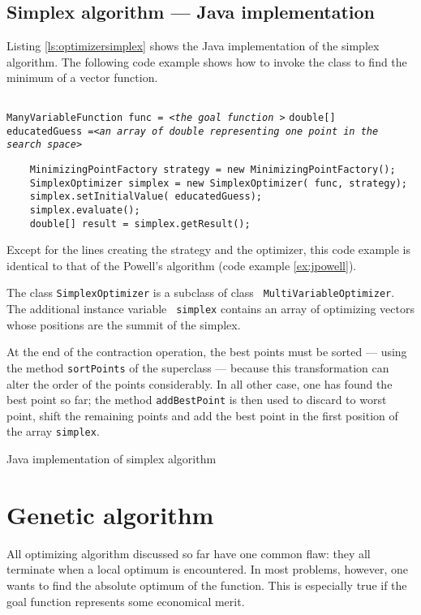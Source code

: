 \documentclass[twoside]{book}
\begin{document}
\subsection{Simplex algorithm --- Java implementation}
 Listing \ref{ls:optimizersimplex} shows
the Java implementation of the simplex algorithm. The following
code example shows how to invoke the class to find the minimum of
a vector function.
\begin{codeExample}
\begin{verbatim}
\end{verbatim}
{\tt ManyVariableFunction func = <\sl the goal function\tt
>}\hfil\break
 {\tt double[] educatedGuess =<\sl an array of double representing one point in the search space\tt >}
\begin{verbatim}
    MinimizingPointFactory strategy = new MinimizingPointFactory();
    SimplexOptimizer simplex = new SimplexOptimizer( func, strategy);
    simplex.setInitialValue( educatedGuess);
    simplex.evaluate();
    double[] result = simplex.getResult();
\end{verbatim}
\end{codeExample}
Except for the lines creating the strategy and the optimizer, this
code example is identical to that of the Powell's algorithm (code
example \ref{ex:jpowell}).

The class {\tt SimplexOptimizer} is a subclass of class {\tt
MultiVariableOptimizer}. The additional instance variable {\tt
simplex} contains an array of optimizing vectors whose positions
are the summit of the simplex.

At the end of the contraction operation, the best points must be
sorted --- using the method {\tt sortPoints} of the superclass ---
because this transformation can alter the order of the points
considerably. In all other case, one has found the best point so
far; the method {\tt addBestPoint} is then used to discard to
worst point, shift the remaining points and add the best point in
the first position of the array {\tt simplex}.

\begin{listing} Java implementation of simplex algorithm
\label{lj:optimizersimplex}

\end{listing}

\section{Genetic algorithm}
All optimizing algorithm discussed so far have one common flaw:
they all terminate when a local optimum is encountered. In most
problems, however, one wants to find the absolute optimum of the
function. This is especially true if the goal function represents
some economical merit.
\end{document}
